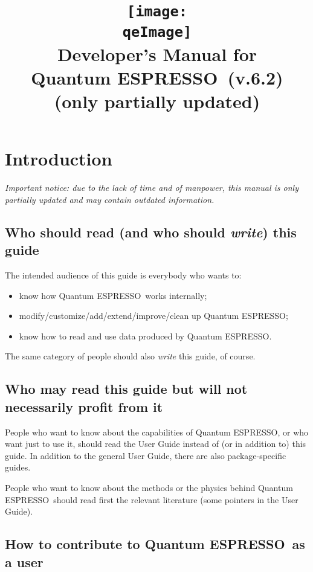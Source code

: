 \documentclass[12pt,a4paper]{article}
\def\version{6.2}
\def\qe{{\sc Quantum ESPRESSO}}
\def\qeImage{quantum_espresso.pdf}
\begin{document}
\author{}
\date{}
\title{
  \texttt{[image: \\qeImage]} \\
  \Huge Developer's Manual for \\ \qe\ (v.\version)
  \\ \Large (only partially updated)
}
\maketitle

\tableofcontents

\newpage

\section{Introduction}

{\em Important notice: due to the lack of time and of manpower, this
manual is only partially updated and may contain outdated information.}

\subsection{Who should read (and who should {\em write}) this guide}

The intended audience of this guide is everybody who wants to:
\begin{itemize}
\item know how \qe\ works internally;
\item modify/customize/add/extend/improve/clean up \qe;
\item know how to read and use data produced by \qe.
\end{itemize}
The same category of people should also {\em write} this guide, of course.

\subsection{Who may read this guide but will not necessarily profit from it}

People who want to know about the capabilities of \qe,
or who want just to use it, should read the User Guide
instead of (or in addition to) this guide. In addition
to the general User Guide, there are also package-specific
guides.

People who want to know about the methods or the physics
behind \qe\ should read first the relevant
literature (some pointers in the User Guide).

\subsection{How to contribute to \qe\ as a user}
\end{document}
